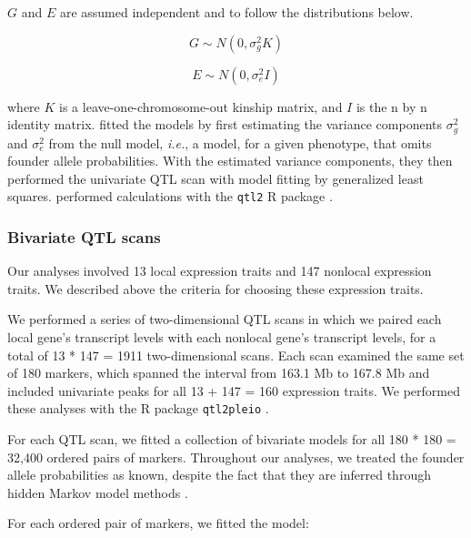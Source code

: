 \documentclass{article}
\begin{document}
$G$ and $E$ are assumed independent and to follow the distributions below.

\begin{equation}
    G \sim N(0, \sigma^2_gK)
\end{equation}

\begin{equation}
    E \sim N(0, \sigma^2_eI)
\end{equation}

where $K$ is a leave-one-chromosome-out kinship matrix, and $I$ is the n by n identity matrix. \citet{keller2018genetic} fitted the models by first estimating the variance components $\sigma^2_g$ and $\sigma^2_e$ from the null model, \emph{i.e.}, a model, for a given phenotype, that omits founder allele probabilities. With the estimated variance components, they then performed the univariate QTL scan with model fitting by generalized least squares. \citet{keller2018genetic} performed calculations with the \texttt{qtl2} R package \citep{Broman2018}.









\subsubsection{Bivariate QTL scans}

Our analyses involved 13 local expression traits and 147 nonlocal expression traits. We described above the criteria for choosing these expression traits.

We performed a series of two-dimensional QTL scans in which we paired each local gene's transcript levels with each nonlocal gene's transcript levels, for a total of 13 * 147 = 1911 two-dimensional scans. Each scan examined the same set of 180 markers, which spanned the interval from 163.1 Mb to 167.8 Mb and included univariate peaks for all 13 + 147 = 160 expression traits. We performed these analyses with the R package \texttt{qtl2pleio} \citep{qtl2pleio}.

For each QTL scan, we fitted a collection of bivariate models for all 180 * 180 = 32,400 ordered pairs of markers. Throughout our analyses, we treated the founder allele probabilities as known, despite the fact that they are inferred through hidden Markov model methods \citep{broman2012genotype, broman2012haplotype, Broman2018}. 

For each ordered pair of markers, we fitted the model:
\end{document}
